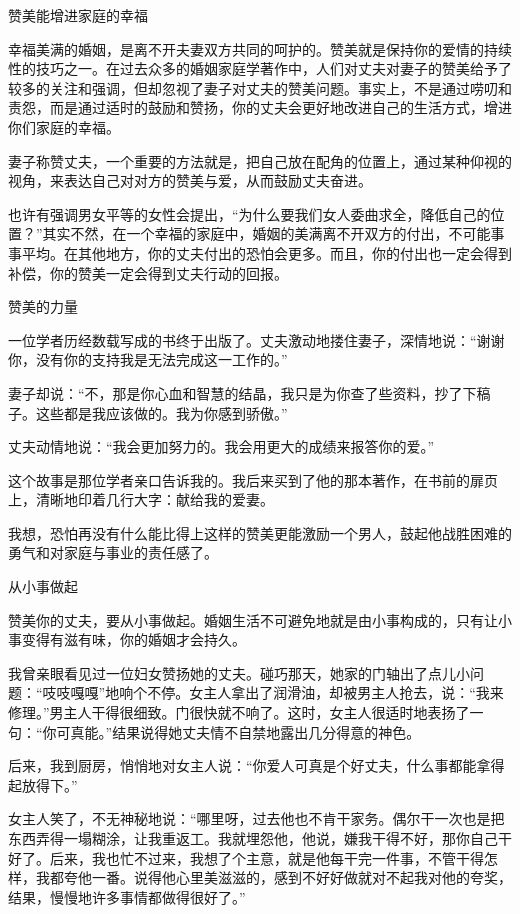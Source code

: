 \documentclass[12pt,UTF8,openany]{ctexbook}
\begin{document}
赞美能增进家庭的幸福


幸福美满的婚姻，是离不开夫妻双方共同的呵护的。赞美就是保持你的爱情的持续性的技巧之一。在过去众多的婚姻家庭学著作中，人们对丈夫对妻子的赞美给予了较多的关注和强调，但却忽视了妻子对丈夫的赞美问题。事实上，不是通过唠叨和责怨，而是通过适时的鼓励和赞扬，你的丈夫会更好地改进自己的生活方式，增进你们家庭的幸福。

妻子称赞丈夫，一个重要的方法就是，把自己放在配角的位置上，通过某种仰视的视角，来表达自己对对方的赞美与爱，从而鼓励丈夫奋进。

也许有强调男女平等的女性会提出，“为什么要我们女人委曲求全，降低自己的位置？”其实不然，在一个幸福的家庭中，婚姻的美满离不开双方的付出，不可能事事平均。在其他地方，你的丈夫付出的恐怕会更多。而且，你的付出也一定会得到补偿，你的赞美一定会得到丈夫行动的回报。





赞美的力量


一位学者历经数载写成的书终于出版了。丈夫激动地搂住妻子，深情地说：“谢谢你，没有你的支持我是无法完成这一工作的。”

妻子却说：“不，那是你心血和智慧的结晶，我只是为你查了些资料，抄了下稿子。这些都是我应该做的。我为你感到骄傲。”

丈夫动情地说：“我会更加努力的。我会用更大的成绩来报答你的爱。”

这个故事是那位学者亲口告诉我的。我后来买到了他的那本著作，在书前的扉页上，清晰地印着几行大字：献给我的爱妻。

我想，恐怕再没有什么能比得上这样的赞美更能激励一个男人，鼓起他战胜困难的勇气和对家庭与事业的责任感了。





从小事做起


赞美你的丈夫，要从小事做起。婚姻生活不可避免地就是由小事构成的，只有让小事变得有滋有味，你的婚姻才会持久。

我曾亲眼看见过一位妇女赞扬她的丈夫。碰巧那天，她家的门轴出了点儿小问题：“吱吱嘎嘎”地响个不停。女主人拿出了润滑油，却被男主人抢去，说：“我来修理。”男主人干得很细致。门很快就不响了。这时，女主人很适时地表扬了一句：“你可真能。”结果说得她丈夫情不自禁地露出几分得意的神色。

后来，我到厨房，悄悄地对女主人说：“你爱人可真是个好丈夫，什么事都能拿得起放得下。”

女主人笑了，不无神秘地说：“哪里呀，过去他也不肯干家务。偶尔干一次也是把东西弄得一塌糊涂，让我重返工。我就埋怨他，他说，嫌我干得不好，那你自己干好了。后来，我也忙不过来，我想了个主意，就是他每干完一件事，不管干得怎样，我都夸他一番。说得他心里美滋滋的，感到不好好做就对不起我对他的夸奖，结果，慢慢地许多事情都做得很好了。”
\end{document}
